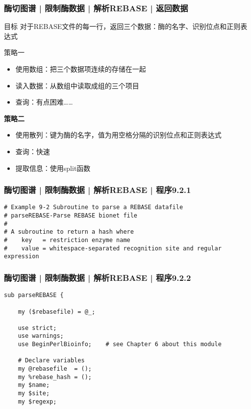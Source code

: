 \begin{frame}
  \frametitle{酶切图谱 | 限制酶数据 | 解析REBASE | 返回数据}
  \begin{block}{目标}
    对于REBASE文件的每一行，返回三个数据：酶的名字、识别位点和正则表达式
  \end{block}
  \pause
  \begin{block}{策略一}
    \begin{itemize}
      \item 使用数组：把三个数据项连续的存储在一起
      \item 读入数据：从数组中读取成组的三个项目
      \item 查询：有点困难……
    \end{itemize}
  \end{block}
  \pause
  \begin{block}{\textbf{策略二}}
    \begin{itemize}
      \item 使用散列：键为酶的名字，值为用空格分隔的识别位点和正则表达式
      \item 查询：快速
      \item 提取信息：使用split函数
    \end{itemize}
  \end{block}
\end{frame}

\begin{frame}[fragile]
  \frametitle{酶切图谱 | 限制酶数据 | 解析REBASE | 程序9.2.1}
\begin{lstlisting}[firstnumber=1]
# Example 9-2 Subroutine to parse a REBASE datafile
# parseREBASE-Parse REBASE bionet file
#
# A subroutine to return a hash where
#    key   = restriction enzyme name
#    value = whitespace-separated recognition site and regular expression
\end{lstlisting}
\end{frame}

\begin{frame}[fragile]
  \frametitle{酶切图谱 | 限制酶数据 | 解析REBASE | 程序9.2.2}
\begin{lstlisting}[firstnumber=8]
sub parseREBASE {

    my ($rebasefile) = @_;

    use strict;
    use warnings;
    use BeginPerlBioinfo;    # see Chapter 6 about this module

    # Declare variables
    my @rebasefile  = ();
    my %rebase_hash = ();
    my $name;
    my $site;
    my $regexp;
\end{lstlisting}
\end{frame}

